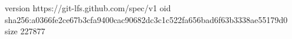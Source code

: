 version https://git-lfs.github.com/spec/v1
oid sha256:a0366fe2ce67b3cfa9400cac90682dc3c1c522fa656bad6f63b3338ae55179d0
size 227877
